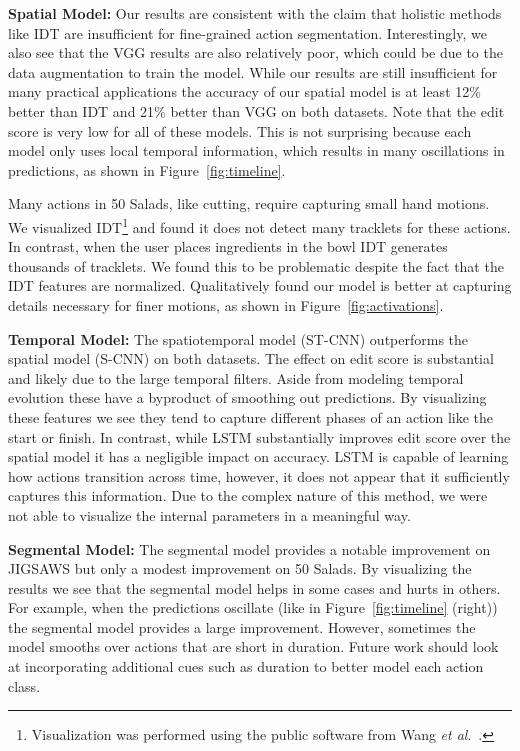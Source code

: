 \documentclass[runningheads]{llncs}
\newcommand{\fakesubsection}[1]{\smallskip\noindent\textbf{#1:}}
\newcommand{\etal}{\emph{et al}.}
\begin{document}
\fakesubsection{Spatial Model}
Our results are consistent with the claim that holistic methods like IDT are insufficient for fine-grained action segmentation. 
Interestingly, we also see that the VGG results are also relatively poor, which could be due to the data augmentation to train the model. 
While our results are still insufficient for many practical applications the accuracy of our spatial model is at least 12\% better than IDT and 21\% better than VGG on both datasets. 
Note that the edit score is very low for all of these models.
This is not surprising because each model only uses local temporal information, which results in many oscillations in predictions, as shown in Figure~\ref{fig:timeline}.


Many actions in 50 Salads, like cutting, require capturing small hand motions. We visualized IDT\footnote{Visualization was performed using the public software from Wang \etal~\cite{wang_iccv_2013}.}
and found it does not detect many tracklets for these actions. In contrast, when the user places ingredients in the bowl IDT generates thousands of tracklets. 
We found this to be problematic despite the fact that the IDT features are normalized. 
Qualitatively found our model is better at capturing details necessary for finer motions, as shown in Figure~\ref{fig:activations}. 

\fakesubsection{Temporal Model}
The spatiotemporal model (ST-CNN) outperforms the spatial model (S-CNN) on both datasets. 
The effect on edit score is substantial and likely due to the large temporal filters. Aside from modeling temporal evolution these have a byproduct of smoothing out predictions. By visualizing these features we see they tend to capture different phases of an action like the start or finish.
In contrast, while LSTM substantially improves edit score over the spatial model it has a negligible impact on accuracy. 
LSTM is capable of learning how actions transition across time, however, it does not appear that it sufficiently captures this information. Due to the complex nature of this method, we were not able to visualize the internal parameters in a meaningful way. 


\fakesubsection{Segmental Model}
The segmental model provides a notable improvement on JIGSAWS but only a modest improvement on 50 Salads. 
By visualizing the results we see that the segmental model helps in some cases and hurts in others. For example, when the predictions oscillate (like in Figure~\ref{fig:timeline} (right)) the segmental model provides a large improvement. However, sometimes the model smooths over actions that are short in duration. Future work should look at incorporating additional cues such as duration to better model each action class.
\end{document}
